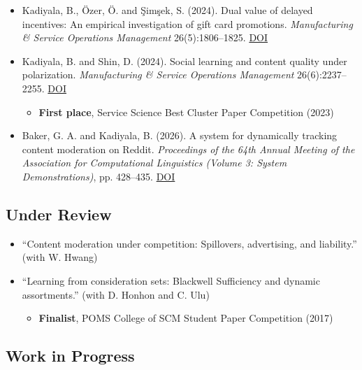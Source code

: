 \documentclass[11pt]{article}
\begin{document}
\begin{itemize}
		\item Kadiyala, B., \"Ozer, \"O. and \c{S}im\c{s}ek, S. (2024). Dual value of delayed incentives: An empirical investigation of gift card promotions. \textit{Manufacturing \& Service Operations Management} 26(5):1806--1825. \href{https://doi.org/10.1287/msom.2022.0218}{DOI}
		\item Kadiyala, B. and Shin, D. (2024). Social learning and content quality under polarization. \textit{Manufacturing \& Service Operations Management}  26(6):2237--2255. \href{https://doi.org/10.1287/msom.2022.0533}{DOI}
		\begin{itemize}[label={$\circ\;$}]
			\item \textbf{First place}, Service Science Best Cluster Paper Competition (2023)
		\end{itemize}
		\item Baker, G. A. and Kadiyala, B. (2026). A system for dynamically tracking content moderation on Reddit. \textit{Proceedings of the 64th Annual Meeting of the Association for Computational Linguistics (Volume 3: System Demonstrations)}, pp. 428--435. \href{https://doi.org/10.18653/v1/2026.acl-demo.42}{DOI}
%

	\end{itemize}

	\subsection*{Under Review}
	\begin{itemize}
		\item  ``Content moderation under competition: Spillovers, advertising, and liability.'' (with W. Hwang)
		\item ``Learning from consideration sets: Blackwell Sufficiency and dynamic assortments.'' (with D. Honhon and C. Ulu)
		\begin{itemize}[label={$\circ\;$}]
			\item \textbf{Finalist}, POMS College of SCM Student Paper Competition (2017)
		\end{itemize}

	\end{itemize}

	\subsection*{Work in Progress}
\end{document}
